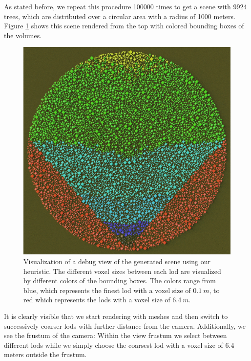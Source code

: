 As stated before, we repeat this procedure 100000 times to get a scene with 9924 trees, which are distributed over a circular area with a radius of 1000 meters.
Figure \ref{fig:visualize_lods} shows this scene rendered from the top with colored bounding boxes of the volumes.
\begin{figure}[t]
    \centering
    \includegraphics[width=0.5\linewidth]{img/visualize_lods.jpg}
    \caption[Visualization of a \ac{lod} scene]{Visualization of a debug view of the generated scene using our heuristic. The different voxel sizes between each \ac{lod} are visualized by different colors of the bounding boxes. The colors range from blue, which represents the finest \ac{lod} with a voxel size of $\SI{0.1}{m}$, to red which represents the \acsp{lod} with a voxel size of $\SI{6.4}{m}$.}
    \label{fig:visualize_lods}
\end{figure}
It is clearly visible that we start rendering with meshes and then switch to successively coarser \acsp{lod} with further distance from the camera.
Additionally, we see the frustum of the camera: Within the view frustum we select between different \acsp{lod} while we simply choose the coarsest \ac{lod} with a voxel size of 6.4 meters outside the frustum.


